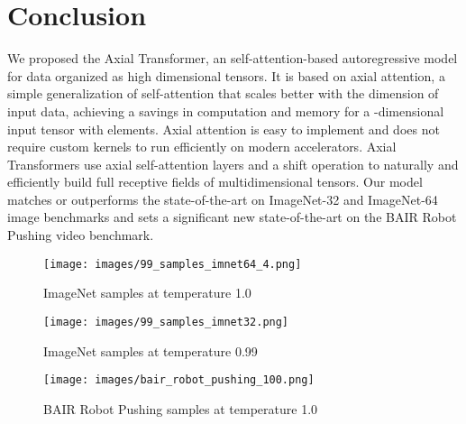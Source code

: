\documentclass{article} \usepackage{iclr2020_conference,times}
\begin{document}
\section{Conclusion}
We proposed the Axial Transformer, an self-attention-based autoregressive model for data organized as high dimensional tensors. It is based on axial attention, a simple generalization of self-attention that scales better with the dimension of input data, achieving a  savings in computation and memory for a -dimensional input tensor with  elements. Axial attention is easy to implement and does not require custom kernels to run efficiently on modern accelerators. Axial Transformers use axial self-attention layers and a shift operation to naturally and efficiently build full receptive fields of multidimensional tensors. Our model matches or outperforms the state-of-the-art on ImageNet-32 and ImageNet-64 image benchmarks and sets a significant new state-of-the-art on the BAIR Robot Pushing video benchmark.



\begin{figure}[hp]
    \centering
    \texttt{[image: images/99\_samples\_imnet64\_4.png]}
    \caption{ ImageNet samples at temperature 1.0}
    \label{fig:imnet64}
\end{figure}

\begin{figure}[hp]
    \centering
    \texttt{[image: images/99\_samples\_imnet32.png]}
    \caption{ ImageNet samples at temperature 0.99}
    \label{fig:imnet32}
\end{figure}

\begin{figure}[hp]
    \centering
    \texttt{[image: images/bair\_robot\_pushing\_100.png]}
    \caption{ BAIR Robot Pushing samples at temperature 1.0}
    \label{fig:bair}
\end{figure}



\FloatBarrier


\end{document}
